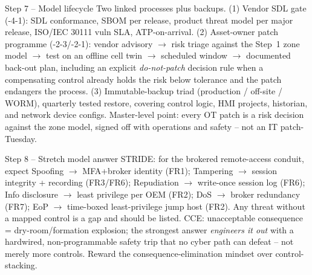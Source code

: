 \documentclass[11pt,a4paper]{article}
\begin{document}
\begin{solutionbox}{Step 7 -- Model lifecycle}
Two linked processes plus backups. (1) Vendor SDL gate (-4-1): SDL
conformance, SBOM per release, product threat model per major release,
ISO/IEC 30111 vuln SLA, ATP-on-arrival. (2) Asset-owner patch programme
(-2-3/-2-1): vendor advisory $\to$ risk triage against the Step~1 zone
model $\to$ test on an offline cell twin $\to$ scheduled window $\to$
documented back-out plan, including an explicit \emph{do-not-patch}
decision rule when a compensating control already holds the risk below
tolerance and the patch endangers the process. (3) Immutable-backup
triad (production / off-site / WORM), quarterly tested restore, covering
control logic, HMI projects, historian, and network device configs.
Master-level point: every OT patch is a risk decision against the zone
model, signed off with operations and safety -- not an IT patch-Tuesday.
\end{solutionbox}

\begin{solutionbox}{Step 8 -- Stretch model answer}
STRIDE: for the brokered remote-access conduit, expect Spoofing
$\to$ MFA+broker identity (FR1); Tampering $\to$ session integrity +
recording (FR3/FR6); Repudiation $\to$ write-once session log (FR6);
Info disclosure $\to$ least privilege per OEM (FR2); DoS $\to$ broker
redundancy (FR7); EoP $\to$ time-boxed least-privilege jump host
(FR2). Any threat without a mapped control is a gap and should be
listed. CCE: unacceptable consequence = dry-room/formation explosion;
the strongest answer \emph{engineers it out} with a hardwired,
non-programmable safety trip that no cyber path can defeat -- not merely
more controls. Reward the consequence-elimination mindset over
control-stacking.
\end{solutionbox}
\end{document}
